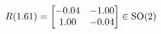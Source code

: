 \documentclass[preview]{standalone}
\begin{document}
\begin{align*}
\special{dvisvgm:raw <g id='unique000'>}R(1.61) = \begin{bmatrix} -0.04 & -1.00 \\ 1.00 & -0.04 \end{bmatrix} \in \text{SO}(2)\special{dvisvgm:raw </g>}
\end{align*}
\end{document}
